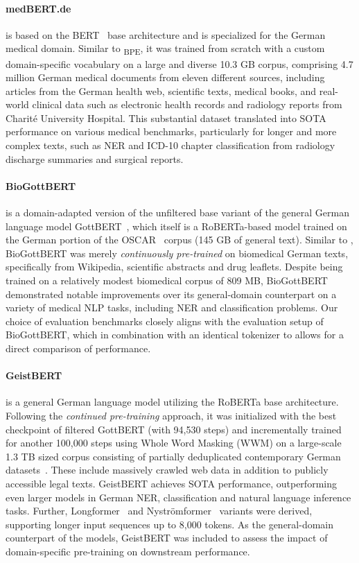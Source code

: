 \paragraph{medBERT.de} is based on the BERT~\cite{devlin2019bert} base
architecture and is specialized for the German medical domain. Similar to
\ChristBERT\textsubscript{BPE}, it was trained from scratch with a custom
domain-specific vocabulary on a large and diverse 10.3 GB corpus, comprising 4.7
million German medical documents from eleven different sources, including
articles from the German health web, scientific texts, medical books, and
real-world clinical data such as electronic health records and radiology reports
from Charité University Hospital. This substantial dataset translated into SOTA
performance on various medical benchmarks, particularly for longer and more
complex texts, such as NER and ICD-10 chapter classification from radiology
discharge summaries and surgical reports.

\paragraph{BioGottBERT} is a domain-adapted version of the unfiltered base
variant of the general German language model
GottBERT~\cite{scheible2020gottbert}, which itself is a RoBERTa-based model
trained on the German portion of the OSCAR~\cite{suarez2019asynchronous} corpus
(145 GB of general text). Similar to \ChristBERT, BioGottBERT was merely
\textit{continuously pre-trained} on biomedical German texts, specifically from
Wikipedia, scientific abstracts and drug leaflets. Despite being trained on a
relatively modest biomedical corpus of 809 MB, BioGottBERT demonstrated notable
improvements over its general-domain counterpart on a variety of medical NLP
tasks, including NER and classification problems. Our choice of evaluation
benchmarks closely aligns with the evaluation setup of BioGottBERT, which in
combination with an identical tokenizer to \ChristBERT{} allows for a direct
comparison of performance.

\paragraph{GeistBERT} is a general German language model utilizing the RoBERTa
base architecture. Following the \textit{continued pre-training} approach, it
was initialized with the best checkpoint of filtered GottBERT
\cite{scheible2020gottbert} (with 94,530 steps) and incrementally trained for
another 100,000 steps using Whole Word Masking (WWM) on a large-scale 1.3 TB
sized corpus consisting of partially deduplicated contemporary German
datasets~\cite{nguyen2023culturax, tiedemann2012parallel}. These include
massively crawled web data in addition to publicly accessible legal texts.
GeistBERT achieves SOTA performance, outperforming even larger models in German
NER, classification and natural language inference tasks. Further,
Longformer~\cite{beltagy2020longformer} and
Nyströmformer~\cite{xiong2021nystromformer} variants were derived, supporting
longer input sequences up to 8,000 tokens. As the general-domain counterpart of
the \ChristBERT{} models, GeistBERT was included to assess the impact of
domain-specific pre-training on downstream performance.


